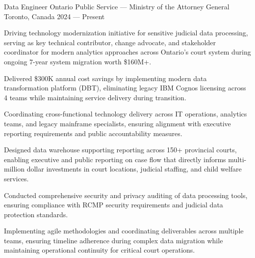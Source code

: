 
\begin{cventries}

\cventry%
 {Data Engineer}
 {Ontario Public Service --- Ministry of the Attorney General}
 {Toronto, Canada}
 {2024 --- Present}
 {
	\begin{cvitems}
		\item Driving technology modernization initiative for sensitive judicial data processing, serving as key technical contributor, change advocate, and stakeholder coordinator for modern analytics approaches across Ontario's court system during ongoing 7-year system migration worth \$160M+.
		\item Delivered \$300K annual cost savings by implementing modern data transformation platform (DBT), eliminating legacy IBM Cognos licensing across 4 teams while maintaining service delivery during transition.
		\item Coordinating cross-functional technology delivery across IT operations, analytics teams, and legacy mainframe specialists, ensuring alignment with executive reporting requirements and public accountability measures.
		\item Designed data warehouse supporting reporting across 150+ provincial courts, enabling executive and public reporting on case flow that directly informs multi-million dollar investments in court locations, judicial staffing, and child welfare services.
		\item Conducted comprehensive security and privacy auditing of data processing tools, ensuring compliance with RCMP security requirements and judicial data protection standards.
		\item Implementing agile methodologies and coordinating deliverables across multiple teams, ensuring timeline adherence during complex data migration while maintaining operational continuity for critical court operations.
	\end{cvitems}
 }


\end{cventries}
